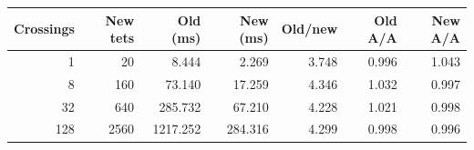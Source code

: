 \begin{tabular}{rrrrrrr}
\toprule
Crossings & New tets & Old (ms) & New (ms) & Old/new & Old A/A & New A/A \\
\midrule
1 & 20 & 8.444 & 2.269 & 3.748 & 0.996 & 1.043 \\
8 & 160 & 73.140 & 17.259 & 4.346 & 1.032 & 0.997 \\
32 & 640 & 285.732 & 67.210 & 4.228 & 1.021 & 0.998 \\
128 & 2560 & 1217.252 & 284.316 & 4.299 & 0.998 & 0.996 \\
\bottomrule
\end{tabular}
